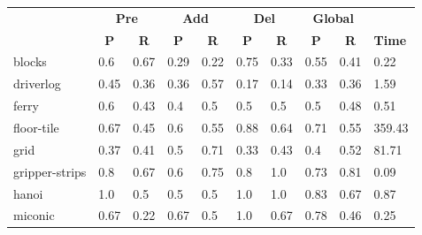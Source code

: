 \begin{table}[hbt!]
\begin{center}
			\begin{tabular}{l|l|l|l|l|l|l||l|l|l|}
				& \multicolumn{2}{|c|}{\bf Pre} & \multicolumn{2}{|c|}{\bf Add} & \multicolumn{2}{|c||}{\bf Del} & \multicolumn{2}{|c|}{\bf Global} & \\ \cline{2-9}			
				& \multicolumn{1}{|c|}{\bf P} & \multicolumn{1}{|c|}{\bf R} & \multicolumn{1}{|c|}{\bf P} & \multicolumn{1}{|c|}{\bf R} & \multicolumn{1}{|c|}{\bf P} & \multicolumn{1}{|c||}{\bf R} &  \multicolumn{1}{|c|}{\bf P} & \multicolumn{1}{|c|}{\bf R} & {\bf Time} \\
				\hline
				blocks & 0.6 & 0.67 & 0.29 & 0.22 & 0.75 & 0.33 & 0.55 & 0.41& 0.22 \\ %
				driverlog & 0.45 & 0.36 & 0.36 & 0.57 & 0.17 & 0.14 & 0.33 & 0.36& 1.59 \\ %
				ferry & 0.6 & 0.43 & 0.4 & 0.5 & 0.5 & 0.5 & 0.5 & 0.48& 0.51 \\ %
				floor-tile & 0.67 & 0.45 & 0.6 & 0.55 & 0.88 & 0.64 & 0.71 & 0.55& 359.43 \\ %
				grid & 0.37 & 0.41 & 0.5 & 0.71 & 0.33 & 0.43 & 0.4 & 0.52& 81.71 \\ %
				gripper-strips & 0.8 & 0.67 & 0.6 & 0.75 & 0.8 & 1.0 & 0.73 & 0.81& 0.09 \\ %
				hanoi & 1.0 & 0.5 & 0.5 & 0.5 & 1.0 & 1.0 & 0.83 & 0.67& 0.87 \\ %
				miconic & 0.67 & 0.22 & 0.67 & 0.5 & 1.0 & 0.67 & 0.78 & 0.46& 0.25 \\ %

\end{tabular}
\end{center}
\end{table}
